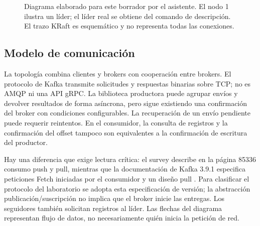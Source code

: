 \documentclass[11pt,a4paper]{article}
\begin{document}
\begin{figure}[ht]\centering
{}
\caption{Diagrama elaborado para este borrador por el asistente. El nodo 1 ilustra un líder; el líder real se obtiene del comando de descripción. El trazo KRaft es esquemático y no representa todas las conexiones.}
\end{figure}

\subsection{Modelo de comunicación}
La topología combina clientes y brokers con cooperación entre brokers. El protocolo de Kafka transmite solicitudes y respuestas binarias sobre TCP; no es AMQP ni una API gRPC. La biblioteca productora puede agrupar envíos y devolver resultados de forma asíncrona, pero sigue existiendo una confirmación del broker con condiciones configurables. La recuperación de un envío pendiente puede requerir reintentos. En el consumidor, la consulta de registros y la confirmación del offset tampoco son equivalentes a la confirmación de escritura del productor.

Hay una diferencia que exige lectura crítica: el survey describe en la página 85336 consumo push y pull, mientras que la documentación de Kafka 3.9.1 especifica peticiones Fetch iniciadas por el consumidor y un diseño pull \cite{raptis2023survey,kafka391design}. Para clasificar el protocolo del laboratorio se adopta esta especificación de versión; la abstracción publicación/suscripción no implica que el broker inicie las entregas. Los seguidores también solicitan registros al líder. Las flechas del diagrama representan flujo de datos, no necesariamente quién inicia la petición de red.
\end{document}
